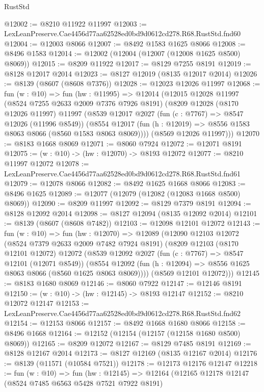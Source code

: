 \begin{lexlean}{RustStd}
\begin{coremodule}
@12002 := @8210 @11922 @11997
@12003 := LexLeanPreserve.Cae4456d77aa62528ed0bd9d0612cd278.R68.RustStd.fnd60
@12004 := @12003 @8066
@12007 := @8492 @1583 @1625 @8066
@12008 := @8496 @1583
@12014 := @12002 (@12004 (@12007 (@12008 @1625 @8500) @8069))
@12015 := @8209 @11922
@12017 := @8129 @7255 @8191
@12019 := @8128 @12017 @2014
@12023 := @8127 @12019 (@8135 @12017 @2014)
@12026 := @8139 (@8607 (@8608 @7376))
@12028 := @12023 @12026 @11997
@12068 := fun (w : @10) =>
  fun (hw : @11995) =>
  @12014
    (@12015
      @12028
      @11997
      (@8524 @7255 @2633 @2009 @7376 @7926 @8191)
      (@8209
        @12028
        (@8170 @12026 @11997)
        @11997
        (@8539
          @12017
          @2027
          (fun (c : @7767) => @8547 @12026 (@11996 @8549))
          (@8554 @12017 (fun (h : @12019) => @8556 @1583 @8063 @8066 (@8560 @1583 @8063 @8069))))
        (@8569 @12026 @11997)))
@12070 := @8183 @1668 @8069
@12071 := @8060 @7924
@12072 := @12071 @8191
@12075 := (w : @10) -> (hw : @12070) -> @8193 @12072
@12077 := @8210 @11997 @12072
@12078 := LexLeanPreserve.Cae4456d77aa62528ed0bd9d0612cd278.R68.RustStd.fnd61
@12079 := @12078 @8066
@12082 := @8492 @1625 @1668 @8066
@12083 := @8496 @1625
@12089 := @12077 (@12079 (@12082 (@12083 @1668 @8500) @8069))
@12090 := @8209 @11997
@12092 := @8129 @7379 @8191
@12094 := @8128 @12092 @2014
@12098 := @8127 @12094 (@8135 @12092 @2014)
@12101 := @8139 (@8607 (@8608 @7482))
@12103 := @12098 @12101 @12072
@12143 := fun (w : @10) =>
  fun (hw : @12070) =>
  @12089
    (@12090
      @12103
      @12072
      (@8524 @7379 @2633 @2009 @7482 @7924 @8191)
      (@8209
        @12103
        (@8170 @12101 @12072)
        @12072
        (@8539
          @12092
          @2027
          (fun (c : @7767) => @8547 @12101 (@12071 @8549))
          (@8554 @12092 (fun (h : @12094) => @8556 @1625 @8063 @8066 (@8560 @1625 @8063 @8069))))
        (@8569 @12101 @12072)))
@12145 := @8183 @1680 @8069
@12146 := @8060 @7922
@12147 := @12146 @8191
@12150 := (w : @10) -> (hw : @12145) -> @8193 @12147
@12152 := @8210 @12072 @12147
@12153 := LexLeanPreserve.Cae4456d77aa62528ed0bd9d0612cd278.R68.RustStd.fnd62
@12154 := @12153 @8066
@12157 := @8492 @1668 @1680 @8066
@12158 := @8496 @1668
@12164 := @12152 (@12154 (@12157 (@12158 @1680 @8500) @8069))
@12165 := @8209 @12072
@12167 := @8129 @7485 @8191
@12169 := @8128 @12167 @2014
@12173 := @8127 @12169 (@8135 @12167 @2014)
@12176 := @8139 (@11571 (@10584 @7521))
@12178 := @12173 @12176 @12147
@12218 := fun (w : @10) =>
  fun (hw : @12145) =>
  @12164
    (@12165
      @12178
      @12147
      (@8524 @7485 @6563 @5428 @7521 @7922 @8191)

\end{coremodule}
\end{lexlean}
